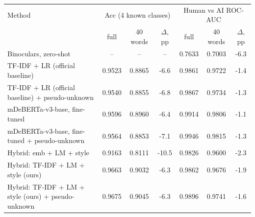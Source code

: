 \begin{tabular}{|l|ccc|ccc|}
\hline
Method & \multicolumn{3}{c|}{Acc (4 known classes)} & \multicolumn{3}{c|}{Human vs AI ROC-AUC} \\
 & full & 40 words & $\Delta$, pp & full & 40 words & $\Delta$, pp \\
\hline
Binoculars, zero-shot & -- & -- & -- & 0.7633 & 0.7003 & -6.3 \\
TF-IDF + LR (official baseline) & 0.9523 & 0.8865 & -6.6 & 0.9861 & 0.9722 & -1.4 \\
TF-IDF + LR (official baseline) + pseudo-unknown & 0.9540 & 0.8855 & -6.8 & 0.9867 & 0.9734 & -1.3 \\
mDeBERTa-v3-base, fine-tuned & 0.9596 & 0.8960 & -6.4 & 0.9914 & 0.9806 & -1.1 \\
mDeBERTa-v3-base, fine-tuned + pseudo-unknown & 0.9564 & 0.8853 & -7.1 & 0.9946 & 0.9815 & -1.3 \\
Hybrid: emb + LM + style & 0.9163 & 0.8111 & -10.5 & 0.9826 & 0.9600 & -2.3 \\
Hybrid: TF-IDF + LM + style (ours) & 0.9663 & 0.9032 & -6.3 & 0.9862 & 0.9676 & -1.9 \\
Hybrid: TF-IDF + LM + style (ours) + pseudo-unknown & 0.9675 & 0.9045 & -6.3 & 0.9896 & 0.9741 & -1.6 \\
\hline
\end{tabular}
